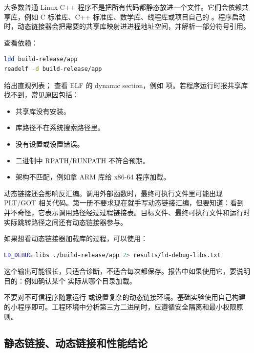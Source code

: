 大多数普通 Linux C++ 程序不是把所有代码都静态放进一个文件。它们会依赖共享库，例如 C 标准库、C++ 标准库、数学库、线程库或项目自己的 。程序启动时，动态链接器会把需要的共享库映射进进程地址空间，并解析一部分符号引用。

查看依赖：

\begin{lstlisting}[language=bash]
ldd build-release/app
readelf -d build-release/app
\end{lstlisting}

 给出直观列表； 查看 ELF 的 dynamic section，例如  项。若程序运行时报共享库找不到，常见原因包括：

\begin{itemize}
  \item 共享库没有安装。
  \item 库路径不在系统搜索路径里。
  \item {} 没有设置或设置错误。
  \item 二进制中 RPATH/RUNPATH 不符合预期。
  \item 架构不匹配，例如拿 ARM 库给 x86-64 程序加载。
\end{itemize}

动态链接还会影响反汇编。调用外部函数时，最终可执行文件里可能出现 PLT/GOT 相关代码。第一册不要求现在就手写动态链接汇编，但要知道：看到  并不奇怪，它表示调用路径经过过程链接表。目标文件、最终可执行文件和运行时实际跳转路径之间还有动态链接器参与。

如果想看动态链接器加载库的过程，可以使用：

\begin{lstlisting}[language=bash]
LD_DEBUG=libs ./build-release/app 2> results/ld-debug-libs.txt
\end{lstlisting}

这个输出可能很长，只适合诊断，不适合每次都保存。报告中如果使用它，要说明目的：例如确认某个  实际从哪个目录加载。

\begin{warningbox}
不要对不可信程序随意运行  或设置复杂的动态链接环境。基础实验使用自己构建的小程序即可。工程环境中分析第三方二进制时，应遵循安全隔离和最小权限原则。
\end{warningbox}

\subsection{静态链接、动态链接和性能结论}

